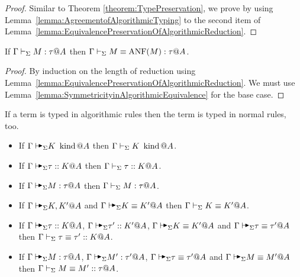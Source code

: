 \begin{proof}
    Similar to Theorem \ref{theorem:TypePreservation}, we prove by using
    Lemma~\ref{lemma:AgreementofAlgorithmicTyping} to the second item of
    Lemma~\ref{lemma:EquivalencePreservationOfAlgorithmicReduction}.
\end{proof}



\begin{corollary}
    \label{corollary:ANFandTermEquivalence}
    If \( \Gamma \vdash_\Sigma M : \tau @ A \) then \( \Gamma \vdash_\Sigma M \equiv \text{ANF}(M) : \tau @ A\).
\end{corollary}
\begin{proof}
    By induction on the length of reduction using
    Lemma~\ref{lemma:EquivalencePreservationOfAlgorithmicReduction}. We must use Lemma~\ref{lemma:SymmetricityinAlgorithmicEquivalence} for the base case.
\end{proof}

\begin{theorem}
    If a term is typed in algorithmic rules then the term is typed in normal rules, too.
    \begin{itemize}
        \item If \(\G\AVS K \iskind @ A \) then \(\Gamma\vdash_\Sigma K \operatorname{\ kind} @A \).
        \item If \(\G\AVS \tau :: K @ A \) then \(\Gamma\vdash_\Sigma \tau ::K  @ A \).
        \item If \(\G\AVS M:\tau @ A \) then \(\Gamma\vdash_\Sigma M:\tau @ A \).
        \item If \(\G\AVS K,K' @ A\) and \(\G\AVS K\E K' @ A \) then \(\Gamma\vdash_\Sigma K\equiv K' @ A \).
        \item If \( \G \AVS \tau :: K @ A \), \( \G \AVS \tau' :: K' @ A \), \( \G \AVS K \E K' @ A\) and \(\G\AVS \tau \E \tau' @ A \) then \(\Gamma\vdash_\Sigma \tau \equiv \tau' :: K @ A \).
        \item If \(\G \AVS M : \tau @ A\), \( \G \AVS M' : \tau' @ A \), \( \G \AVS \tau \E \tau' @ A\) and \(\G\AVS M\E M' @ A \) then \(\Gamma\vdash_\Sigma M\equiv M' :: \tau @ A \).
    \end{itemize}
\end{theorem}

